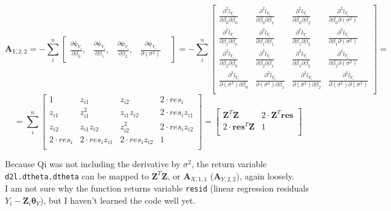 \documentclass[]{article}
\begin{document}
\[
\pmb{A}_{Y,2,2} = -\sum_i^n\begin{bmatrix}
    \frac{\partial \pmb{\psi}_{Y_i}}{ \partial \beta_0},  &
    \frac{\partial \pmb{\psi}_{Y_i}}{ \partial \beta_1}, &
    \frac{\partial \pmb{\psi}_{Y_i}}{ \partial \beta_2}, &
    \frac{\partial \pmb{\psi}_{Y_i}}{ \partial (\sigma^2)} &
\end{bmatrix}
 =-\sum_i^n\begin{bmatrix}
    \frac{\partial^2 l_{Y_i}}{ \partial \beta_0\partial \beta_0}  & \frac{\partial^2 l_{Y_i}}{ \partial \beta_0\partial \beta_1} & \frac{\partial^2 l_{Y_i}}{ \partial \beta_0\partial \beta_2} & \frac{\partial^2 l_{Y_i}}{ \partial \beta_0 \partial (\sigma^2)}\\
    \frac{\partial^2 l_{Y_i}}{ \partial \beta_1\partial \beta_o}  & \frac{\partial^2 l_{Y_i}}{ \partial \beta_1\partial \beta_1} & \frac{\partial^2 l_{Y_i}}{ \partial \beta_1\partial \beta_2} & \frac{\partial^2 l_{Y_i}}{ \partial \beta_1 \partial (\sigma^2)}\\
    \frac{\partial^2 l_{Y_i}}{ \partial \beta_2\partial \beta_0}  & \frac{\partial^2 l_{Y_i}}{ \partial \beta_2\partial \beta_1} & \frac{\partial^2 l_{Y_i}}{ \partial \beta_2\partial \beta_2} & \frac{\partial^2 l_{Y_i}}{ \partial \beta_2 \partial (\sigma^2)}\\
    \frac{\partial^2 l_{Y_i}}{ \partial (\sigma^2) \partial \beta_0}  & \frac{\partial^2 l_{Y_i}}{ \partial (\sigma^2) \partial \beta_1} & \frac{\partial^2 l_{Y_i}}{ \partial (\sigma^2)\partial \beta_2} & \frac{\partial^2 l_{Y_i}}{ \partial (\sigma^2) \partial (\sigma^2)}\\
\end{bmatrix} =
\]
\[
  =\sum_i^n\begin{bmatrix}
    1   &  z_{i1}   & z_{i2}  &  2 \cdot res_i\\
    z_{i1}   &  z_{i1}^2   & z_{i1}z_{i2}  &  2 \cdot res_iz_{i1} \\
    z_{i2}   &  z_{i1}z_{i2}   & z_{i2}^2  &  2 \cdot res_iz_{i2}  \\
    2 \cdot res_i   & 2 \cdot res_iz_{i1}   & 2 \cdot res_iz_{i2}  &  1 \\
\end{bmatrix}=
\begin{bmatrix}
  \pmb{Z}^T\pmb{Z} & 2 \cdot \pmb{Z}^T \pmb{res}\\
  2 \cdot \pmb{res}^T\pmb{Z} & 1\\
  \end{bmatrix}
\]

Because Qi was not including the derivative by $\sigma^2$, the return variable \texttt{d2l.dtheta.dtheta} can be mapped to  $\pmb{Z}^T\pmb{Z}$, or $\pmb{A}_{X,1,1}$ ($\pmb{A}_{Y,2,2}$), again loosely.\\
I am not sure why the function returns variable \texttt{resid} (linear regression residuals $Y_i - \pmb{Z}_i\pmb{\theta}_Y$), but I haven't learned the code well yet.\\
\end{document}

